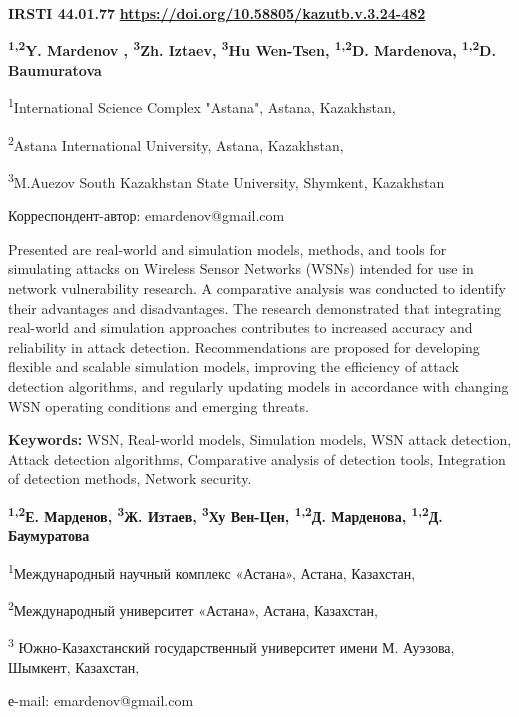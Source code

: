 \newpage
{\bfseries IRSTI 44.01.77}
\hfill {\bfseries \href{https://doi.org/10.58805/kazutb.v.3.24-482}{https://doi.org/10.58805/kazutb.v.3.24-482}}


\begin{center}

{\bfseries \textsuperscript{1,2}Y. Mardenov \envelope,
\textsuperscript{3}Zh. Iztaev, \textsuperscript{3}Hu Wen-Tsen,
\textsuperscript{1,2}D. Mardenova, \textsuperscript{1,2}D. Baumuratova}

\textsuperscript{1}International Science Complex "Astana", Astana,
Kazakhstan,

\textsuperscript{2}Astana International University, Astana, Kazakhstan,

\textsuperscript{3}M.Auezov South Kazakhstan State University, Shymkent,
Kazakhstan
\end{center}
\envelope Корреспондент-автор: emardenov@gmail.com\vspace{0.5cm}

Presented are real-world and simulation models, methods, and tools for
simulating attacks on Wireless Sensor Networks (WSNs) intended for use
in network vulnerability research. A comparative analysis was conducted
to identify their advantages and disadvantages. The research
demonstrated that integrating real-world and simulation approaches
contributes to increased accuracy and reliability in attack detection.
Recommendations are proposed for developing flexible and scalable
simulation models, improving the efficiency of attack detection
algorithms, and regularly updating models in accordance with changing
WSN operating conditions and emerging threats.

{\bfseries Keywords:} WSN, Real-world models, Simulation models, WSN
attack detection, Attack detection algorithms, Comparative analysis of
detection tools, Integration of detection methods, Network security.



\begin{center}
{\bfseries \textsuperscript{1,2}Е. Марденов\envelope,
\textsuperscript{3}Ж. Изтаев, \textsuperscript{3}Ху Вен-Цен,
\textsuperscript{1,2}Д. Марденова, \textsuperscript{1,2}Д. Баумуратова}

\textsuperscript{1}Международный научный комплекс «Астана», Астана,
Казахстан,

\textsuperscript{2}Международный университет «Астана», Астана,
Казахстан,

\textsuperscript{3} Южно-Казахстанский государственный университет имени
М. Ауэзова, Шымкент, Казахстан,

е-mail: emardenov@gmail.com
\end{center}

